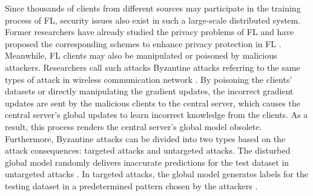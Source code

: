 \documentclass[journal]{IEEEtran}
\begin{document}
\par Since thousands of clients from different sources may participate in the training process of FL, security issues also exist in such a large-scale distributed system. Former researchers have already studied the privacy problems of FL and have proposed the corresponding schemes to enhance privacy protection in FL \cite{ref_33_privacy, ref_34_VerifyNet}. Meanwhile, FL clients may also be manipulated or poisoned by malicious attackers. Researchers call such attacks Byzantine attacks referring to the same types of attack in wireless communication network \cite{ref_35_Byzantine,ref_36_Byzantine,ref_37_Byzantine,ref_38_Byzantine,ref_40_Byzantine}. By poisoning the clients' datasets or directly manipulating the gradient updates, the incorrect gradient updates are sent by the malicious clients to the central server, which causes the central server's global updates to learn incorrect knowledge from the clients. As a result, this process renders the central server's global model obsolete. Furthermore, Byzantine attacks can be divided into two types based on the attack consequences: targeted attacks and untargeted attacks. The disturbed global model randomly delivers inaccurate predictions for the test dataset in untargeted attacks \cite{ref_04_model,ref_06_model,ref_07_data}. In targeted attacks, the global model generates labels for the testing dataset in a predetermined pattern chosen by the attackers \cite{ref_08_data,ref_09_backdoor,ref_10_backdoor,ref_11_backdoor,ref_19_backdoor}.
\end{document}
